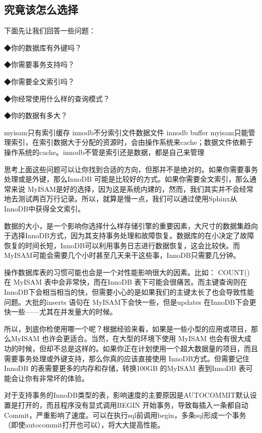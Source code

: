 \documentclass[UTF8]{ctexart}
\begin{document}
\subsection{究竟该怎么选择}

下面先让我们回答一些问题：   

◆你的数据库有外键吗？   

◆你需要事务支持吗？   

◆你需要全文索引吗？   

◆你经常使用什么样的查询模式？   

◆你的数据有多大？   
  
myisam只有索引缓存   
innodb不分索引文件数据文件 innodb buffer   
myisam只能管理索引，在索引数据大于分配的资源时，会由操作系统来cache；数据文件依赖于操作系统的cache。innodb不管是索引还是数据，都是自己来管理  
  
思考上面这些问题可以让你找到合适的方向，但那并不是绝对的。如果你需要事务处理或是外键，那么InnoDB 可能是比较好的方式。如果你需要全文索引，那么通常来说 MyISAM是好的选择，因为这是系统内建的，然而，我们其实并不会经常地去测试两百万行记录。所以，就算是慢一点，我们可以通过使用Sphinx从InnoDB中获得全文索引。  
  
数据的大小，是一个影响你选择什么样存储引擎的重要因素，大尺寸的数据集趋向于选择InnoDB方式，因为其支持事务处理和故障恢复。数据库的在小决定了故障恢复的时间长短，InnoDB可以利用事务日志进行数据恢复，这会比较快。而MyISAM可能会需要几个小时甚至几天来干这些事，InnoDB只需要几分钟。  
  
操作数据库表的习惯可能也会是一个对性能影响很大的因素。比如： COUNT() 在 MyISAM 表中会非常快，而在InnoDB 表下可能会很痛苦。而主键查询则在InnoDB下会相当相当的快，但需要小心的是如果我们的主键太长了也会导致性能问题。大批的inserts 语句在 MyISAM下会快一些，但是updates 在InnoDB下会更快一些——尤其在并发量大的时候。  
  
所以，到底你检使用哪一个呢？根据经验来看，如果是一些小型的应用或项目，那么MyISAM 也许会更适合。当然，在大型的环境下使用 MyISAM 也会有很大成功的时候，但却不总是这样的。如果你正在计划使用一个超大数据量的项目，而且需要事务处理或外键支持，那么你真的应该直接使用 InnoDB方式。但需要记住InnoDB 的表需要更多的内存和存储，转换100GB 的MyISAM 表到InnoDB 表可能会让你有非常坏的体验。  
  
对于支持事务的InnoDB类型的表，影响速度的主要原因是AUTOCOMMIT默认设置是打开的，而且程序没有显式调用BEGIN 开始事务，导致每插入一条都自动Commit，严重影响了速度。可以在执行sql前调用begin，多条sql形成一个事务（即使autocommit打开也可以），将大大提高性能。  
\end{document}

